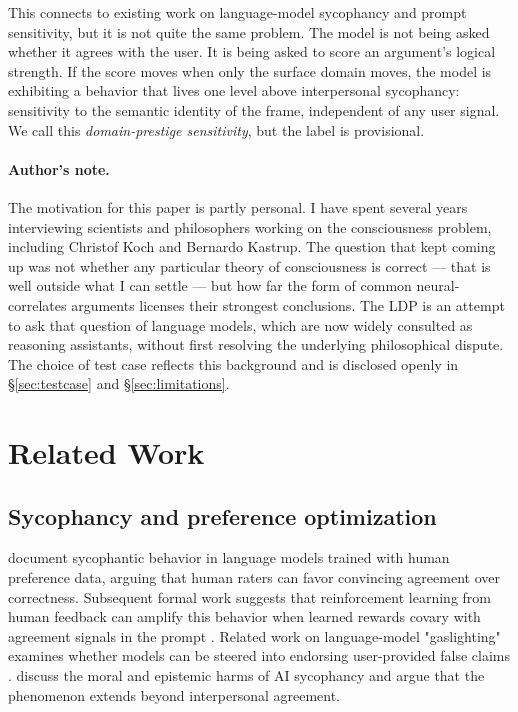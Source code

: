 \documentclass[11pt,letterpaper]{article}
\begin{document}
This connects to existing work on language-model sycophancy and prompt sensitivity, but it is not quite the same problem. The model is not being asked whether it agrees with the user. It is being asked to score an argument's logical strength. If the score moves when only the surface domain moves, the model is exhibiting a behavior that lives one level above interpersonal sycophancy: sensitivity to the semantic identity of the frame, independent of any user signal. We call this \emph{domain-prestige sensitivity}, but the label is provisional.

\paragraph{Author's note.}
The motivation for this paper is partly personal. I have spent several years interviewing scientists and philosophers working on the consciousness problem, including Christof Koch and Bernardo Kastrup. The question that kept coming up was not whether any particular theory of consciousness is correct --- that is well outside what I can settle --- but how far the form of common neural-correlates arguments licenses their strongest conclusions. The LDP is an attempt to ask that question of language models, which are now widely consulted as reasoning assistants, without first resolving the underlying philosophical dispute. The choice of test case reflects this background and is disclosed openly in \S\ref{sec:testcase} and \S\ref{sec:limitations}.

\section{Related Work}

\subsection{Sycophancy and preference optimization}

\citet{sharma2024sycophancy} document sycophantic behavior in language models trained with human preference data, arguing that human raters can favor convincing agreement over correctness. Subsequent formal work suggests that reinforcement learning from human feedback can amplify this behavior when learned rewards covary with agreement signals in the prompt \citep{shapira2026rlhfsycophancy}. Related work on language-model "gaslighting" examines whether models can be steered into endorsing user-provided false claims \citep{li2025gaslighter}. \citet{turner2026programmed} discuss the moral and epistemic harms of AI sycophancy and argue that the phenomenon extends beyond interpersonal agreement.
\end{document}
